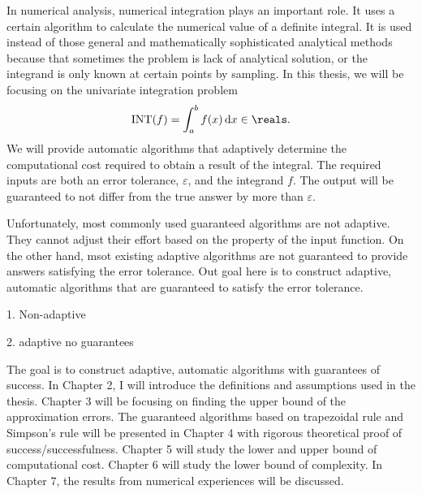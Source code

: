 \documentclass{iitthesis}
\theoremstyle{definition}
\theoremstyle{remark}
\begin{document}
In numerical analysis, numerical integration plays an important role. It uses a certain algorithm to calculate the numerical value of a definite integral. It is used instead of those general and mathematically sophisticated analytical methods because that sometimes the problem is lack of analytical solution, or the integrand is only known at certain points by sampling. In this thesis, we will be focusing on the univariate integration problem
\begin{equation}\label{integral}
    \text{INT}(f)=\int_{a}^{b}f(x)\,\textup{d}x\in\reals.
\end{equation}
We will provide automatic algorithms that adaptively determine the computational cost required to obtain a result of the integral. The required inputs are both an error tolerance, $\varepsilon$, and the integrand $f$. The output will be guaranteed to not differ from the true answer by more than $\varepsilon$.

Unfortunately, most commonly used guaranteed algorithms are not adaptive. They cannot adjust their effort based on the property of the input function. On the other hand, msot existing adaptive algorithms are not guaranteed to provide answers satisfying the error tolerance. Out goal here is to construct adaptive, automatic algorithms that are guaranteed to satisfy the error tolerance.


1. Non-adaptive


2. adaptive no guarantees







The goal is to construct adaptive, automatic algorithms with guarantees of success. In Chapter 2, I will introduce the definitions and assumptions used in the thesis. Chapter 3 will be focusing on finding the upper bound of the approximation errors. The guaranteed algorithms based on trapezoidal rule and Simpson's rule will be presented in Chapter 4 with rigorous theoretical proof of success/successfulness. Chapter 5 will study the lower and upper bound of computational cost. Chapter 6 will study the lower bound of complexity. In Chapter 7, the results from numerical experiences will be discussed.

\clearpage
\end{document}
